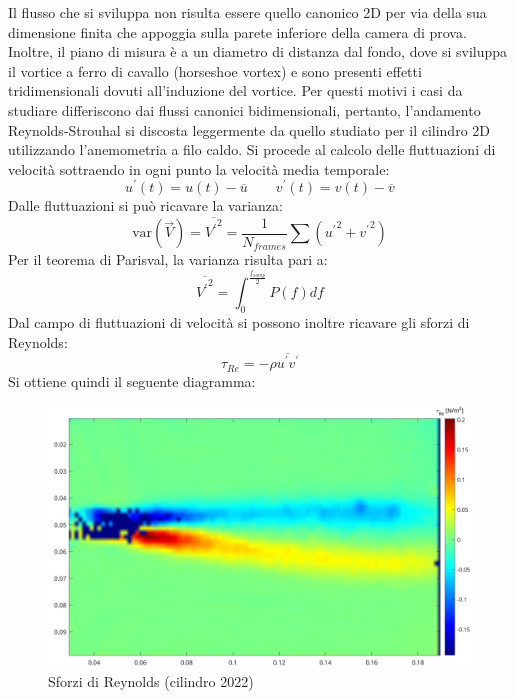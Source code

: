 \noindent Il flusso che si sviluppa non risulta essere quello canonico 2D per via della sua dimensione finita che appoggia sulla parete inferiore della camera di prova. Inoltre, il piano di misura è a un diametro di distanza dal fondo, dove si sviluppa il vortice a ferro di cavallo (horseshoe vortex) e sono presenti effetti tridimensionali dovuti all'induzione del vortice. Per questi motivi i casi da studiare differiscono dai flussi canonici bidimensionali, pertanto, l'andamento Reynolds-Strouhal si discosta leggermente da quello studiato per il cilindro 2D utilizzando l'anemometria a filo caldo.
\newpage
\noindent Si procede al calcolo delle fluttuazioni di velocità sottraendo in ogni punto la velocità media temporale:
\begin{equation*}
    u^\prime(t) = u(t) - \overline u \qquad v^\prime(t) = v(t) - \overline v  
\end{equation*}
Dalle fluttuazioni si può ricavare la varianza:
\begin{equation*}
    \text{var}(\vec V) = \overline{{V^\prime}^2} = \frac 1{N_{frames}} \sum ({u^\prime}^2 + {v^\prime}^2)
\end{equation*}
Per il teorema di Parisval, la varianza risulta pari a:
\begin{equation*}
    \overline{{V^\prime}^2} = \int_0^{\frac{f_{samp}}2} P(f) df
\end{equation*}
Dal campo di fluttuazioni di velocità si possono inoltre ricavare gli sforzi di Reynolds:
\begin{equation*}
    \tau_{Re} = -\rho \overline{u^\prime v^\prime}
\end{equation*}
Si ottiene quindi il seguente diagramma:
\begin{figure}[H]
    \centering
    \includegraphics[width=\textwidth]{images/11/tauRe.png}
    \caption{Sforzi di Reynolds (cilindro 2022)}
\end{figure}